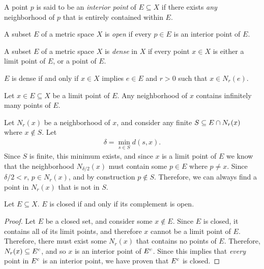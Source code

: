 \begin{defn}
    A point $p$ is said to be an \emph{interior point} of $E \subseteq X$ if there exists \emph{any} neighborhood of $p$ that is entirely contained within $E$.
\end{defn}

\begin{defn}
    A subset $E$ of a metric space $X$ is \emph{open} if every $p \in E$ is an interior point of $E$.
\end{defn}

\begin{defn}
    A subset $E$ of a metric space $X$ is \emph{dense} in $X$ if every point $x \in X$ is either a limit point of $E$, or a point of $E$.
\end{defn}

\begin{prop}
    $E$ is dense if and only if $x \in X$ implies $e \in E$ and $r > 0$ such that $x \in N_r(e)$.
\end{prop}

\begin{thm}\label{thm:neighborhood-limit-points}
    Let $x \in E \subseteq X$ be a limit point of $E$. Any neighborhood of $x$ contains infinitely many points of $E$.
\end{thm}

\begin{defn}
    Let $N_{r}(x)$ be a neighborhood of $x$, and consider any finite $S \subseteq E \cap N_{r}(x)$ where $x \not\in S$. Let
    \begin{align*}
        \delta = \min_{s \in S}d(s, x).
    \end{align*}
    Since $S$ is finite, this minimum exists, and since $x$ is a limit point of $E$ we know that the neighborhood $N_{\delta/2}(x)$ must contain some $p \in E$ where $p \neq x$. Since $\delta/2 < r$, $p \in N_{r}(x)$, and by construction $p \not\in S$. Therefore, we can always find a point in $N_{r}(x)$ that is not in $S$.
\end{defn}

\begin{thm}\label{thm:closed-open-complements}
    Let $E \subseteq X$. $E$ is closed if and only if its complement is open.
\end{thm}

\begin{proof}
    Let $E$ be a closed set, and consider some $x \not\in E$. Since $E$ is closed, it contains all of its limit points, and therefore $x$ cannot be a limit point of $E$. Therefore, there must exist some $N_{r}(x)$ that contains no points of $E$. Therefore, $N_{r}(x) \subseteq E^{c}$, and so $x$ is an interior point of $E^{c}$. Since this implies that \emph{every} point in $E^{c}$ is an interior point, we have proven that $E^{c}$ is closed.
\end{proof}

